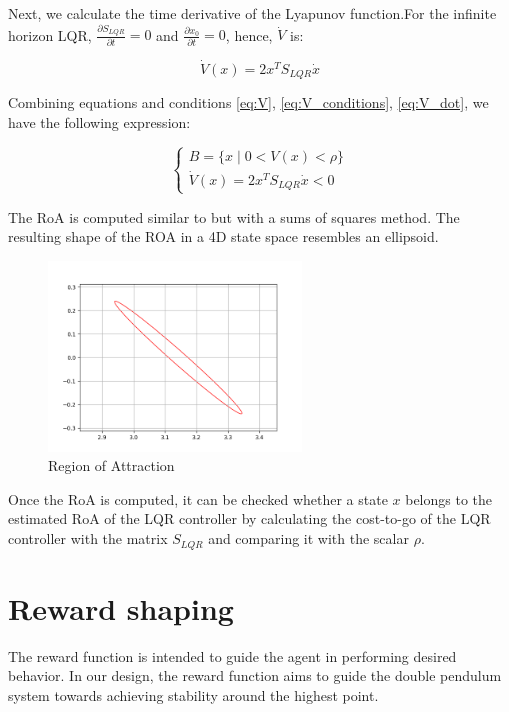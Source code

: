 Next, we calculate the time derivative of the Lyapunov function.For the infinite horizon LQR, \(\frac{\partial S_{LQR}}{\partial t} = 0\) and \(\frac{\partial x_0}{\partial t} = 0\), hence, \(\dot{V}\) is:

\begin{equation}
\dot{V}(x) = 2x^{T}S_{LQR}\dot{x}
\label{eq:V_dot}
\end{equation}

Combining equations and conditions \ref{eq:V}, \ref{eq:V_conditions}, \ref{eq:V_dot}, we have the following expression:

\begin{equation}
\begin{cases}
    B = \{ x \mid 0 < V(x) < \rho \} \\
    \dot{V}(x) = 2x^T S_{LQR} \dot{x} < 0
\end{cases}
\end{equation}

The RoA is computed similar to\cite{maywald2022co} but with a sums of squares method\cite{tedrake2010lqr}. The resulting shape of the ROA in a 4D state space resembles an ellipsoid.

\begin{figure}[htbp]
    \centering
    \includegraphics[width=0.6\textwidth]{figures/methodology/roaplot.png} %
    \caption{Region of Attraction}
    \label{fig:example}
\end{figure}

Once the RoA is computed, it can be checked whether a state \(x\) belongs to the estimated RoA of the LQR controller by calculating the cost-to-go of the LQR controller with the matrix \(S_{LQR}\) and comparing it with the scalar \(\rho\).

\section{Reward shaping}
The reward function is intended to guide the agent in performing desired behavior. In our design, the reward function aims to guide the double pendulum system towards achieving stability around the highest point.

